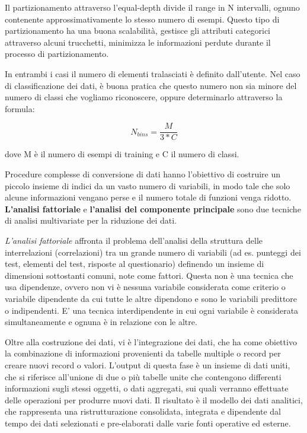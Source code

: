 \documentclass[a4paper]{extarticle}
\begin{document}
Il partizionamento attraverso l'equal-depth divide il range in N intervalli, ognuno contenente approssimativamente lo stesso numero di esempi. Questo tipo di partizionamento ha una buona scalabilità, gestisce gli attributi categorici attraverso alcuni trucchetti, minimizza le informazioni perdute durante il processo di partizionamento.

In entrambi i casi il numero di elementi tralasciati è definito dall'utente. Nel caso di classificazione dei dati, è buona pratica che questo numero non sia minore del numero di classi che vogliamo riconoscere, oppure determinarlo attraverso la formula:

\begin{equation*}
N_{bins} = \dfrac{M}{3*C}
\end{equation*}

dove M è il numero di esempi di training e C il numero di classi.

Procedure complesse di conversione di dati hanno l'obiettivo di costruire un piccolo insieme di indici da un vasto numero di variabili, in modo tale che solo alcune informazioni vengano perse e il numero totale di funzioni venga ridotto. \textbf{L'analisi fattoriale} e \textbf{l'analisi del componente principale} sono due tecniche di analisi multivariate per la riduzione dei dati. 

\textit{L'analisi fattoriale} affronta il problema dell'analisi della struttura delle interrelazioni (correlazioni) tra un grande numero di variabili (ad es. punteggi dei test, elementi del test, risposte al questionario) definendo un insieme di dimensioni sottostanti comuni, note come fattori. Questa non è una tecnica che usa dipendenze, ovvero non vi è nessuna variabile considerata come criterio o variabile dipendente da cui tutte le altre dipendono e sono le variabili predittore o indipendenti. E' una tecnica interdipendente in cui ogni variabile è considerata simultaneamente e ognuna è in relazione con le altre.

Oltre alla costruzione dei dati, vi è l'integrazione dei dati, che ha come obiettivo la combinazione di informazioni provenienti da tabelle multiple o record per creare nuovi record o valori. L'output di questa fase è un insieme di dati uniti, che si riferisce all'unione di due o più tabelle unite che contengono differenti informazioni sugli stessi oggetti, o dati aggregati, sui quali verranno effettuate delle operazioni per produrre nuovi dati. Il risultato è il modello dei dati analitici, che rappresenta una ristrutturazione consolidata, integrata e dipendente dal tempo dei dati selezionati e pre-elaborati dalle varie fonti operative ed esterne. 
\end{document}
